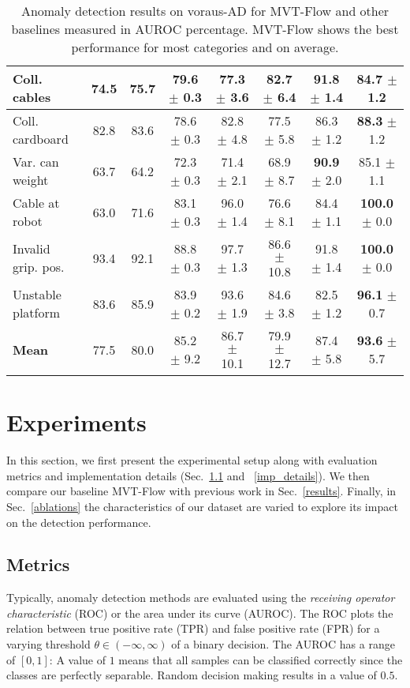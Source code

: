 \documentclass[journal]{IEEEtran}
\newcommand\datasetname{voraus-AD}
\begin{document}
\begin{table*}[h!b]
\begin{center}
\begin{tabular}{l c c c c c c c}
    Coll. cables & 74.5 & 75.7 & 79.6 $\pm$ 0.3 &  77.3 $\pm$ 3.6 & 82.7 $\pm$ 6.4 & \textbf{91.8} $\pm$ 1.4&  84.7 $\pm$ 1.2\\ \hline
    Coll. cardboard & 82.8 & 83.6 & 78.6 $\pm$ 0.3 &  82.8 $\pm$ 4.8  & 77.5 $\pm$ 5.8 & 86.3 $\pm$ 1.2&  \textbf{88.3} $\pm$ 1.2\\ \hline
    Var. can weight& 63.7 & 64.2 & 72.3 $\pm$ 0.3 &71.4 $\pm$ 2.1  & 68.9 $\pm$ 8.7 & \textbf{90.9} $\pm$ 2.0 &   85.1 $\pm$ 1.1\\ \hline
    Cable at robot & 63.0 & 71.6 & 83.1 $\pm$ 0.3 & 96.0 $\pm$ 1.4 & 76.6 $\pm$ 8.1 & 84.4 $\pm$ 1.1 &  \textbf{100.0} $\pm$ 0.0\\ \hline
    Invalid grip. pos. & 93.4 & 92.1 & 88.8 $\pm$ 0.3 & 97.7 $\pm$ 1.3 & 86.6 $\pm$ 10.8 & 91.8 $\pm$ 1.4 &  \textbf{100.0} $\pm$ 0.0\\ \hline
    Unstable platform & 83.6 & 85.9 & 83.9 $\pm$ 0.2  & 93.6 $\pm$ 1.9 & 84.6 $\pm$ 3.8 & 82.5 $\pm$ 1.2 &  \textbf{96.1} $\pm$ 0.7\\ \hline
  \rowcolor[HTML]{EEEEEE} \textbf{Mean} & 77.5 & 80.0 & 85.2 $\pm$ 9.2 & 86.7 $\pm$ 10.1  &79.9 $\pm$ 12.7 & 87.4 $\pm$ 5.8  & \textbf{93.6} $\pm$ 5.7\\  \hline
    \end{tabular}
\end{center}
\vspace{-0.15cm}
\caption{Anomaly detection results on \datasetname{} for MVT-Flow and other baselines measured in AUROC percentage. MVT-Flow shows the best performance for most categories and {on average}.}
\label{table:results}
\vspace{-0.35cm}
\end{table*}



\section{Experiments}
In this section, we first present the experimental setup along with evaluation metrics and implementation details (Sec.~\ref{metrics} and ~\ref{imp_details}).
We then compare our baseline MVT-Flow with previous work in Sec.~\ref{results}.
Finally, in Sec.~\ref{ablations} the characteristics of our dataset are varied to explore its impact on the detection performance.
\subsection{Metrics}
\label{metrics}
Typically, anomaly detection methods are evaluated using the \textit{receiving operator characteristic} (ROC) or the area under its curve (AUROC).
The ROC plots the relation between true positive rate (TPR) and false positive rate (FPR) for a varying threshold $\theta \in (-\infty, \infty)$ of a binary decision.
The AUROC has a range of $[0, 1]$:
A value of $1$ means that all samples can be classified correctly since the classes are perfectly separable.
Random decision making results in a value of $0.5$.
\end{document}
